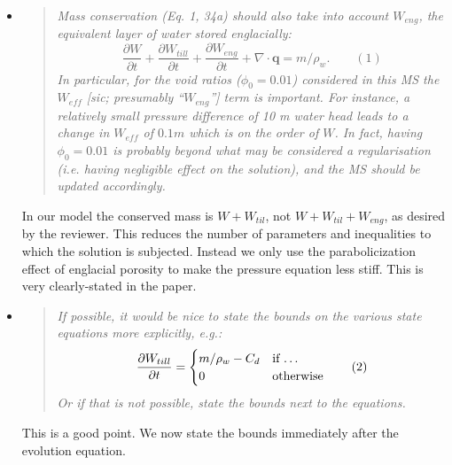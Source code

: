 \documentclass[11pt,reqno]{amsart}
\newcommand{\reply}[2]{
\medskip\medskip
\item  \begin{quote}
\emph{#1}
\end{quote}

\medskip
\noindent #2}
\begin{document}
\begin{itemize}
\reply{Mass conservation (Eq. 1, 34a) should also take into account $W_{eng}$, the equivalent layer of water stored englacially:
   $$\frac{\partial W}{\partial t} + \frac{\partial W_{till}}{\partial t} + \frac{\partial W_{eng}}{\partial t} + \nabla \cdot \mathbf{q} = m /\rho_w. \qquad (1)$$
In particular, for the void ratios ($\phi_0 = 0.01$) considered in this MS the $W_{eff}$ [sic; presumably ``$W_{eng}$''] term is important.  For instance, a relatively small pressure difference of 10 m water head leads to a change in $W_{eff}$ of $0.1 m$ which is on the order of $W$. In fact, having $\phi_0 = 0.01$ is probably beyond what may be considered a regularisation (i.e. having negligible effect on the solution), and the MS should be updated accordingly.}
{In our model the conserved mass is $W+W_{til}$, not $W+W_{til}+W_{eng}$, as desired by the reviewer.  This reduces the number of parameters and inequalities to which the solution is subjected.  Instead we only use the parabolicization effect of englacial porosity to make the pressure equation less stiff.  This is very clearly-stated in the paper.}

\reply{If possible, it would be nice to state the bounds on the various state equations more explicitly, e.g.:
  $$\frac{\partial W_{till}}{\partial t} = \begin{cases} m /\rho_w - C_d & \text{if \dots} \\  0 & \text{otherwise}  \end{cases} \qquad (2)$$
Or if that is not possible, state the bounds next to the equations.}
{This is a good point.  We now state the bounds immediately after the evolution equation.}


\end{itemize}
\end{document}
